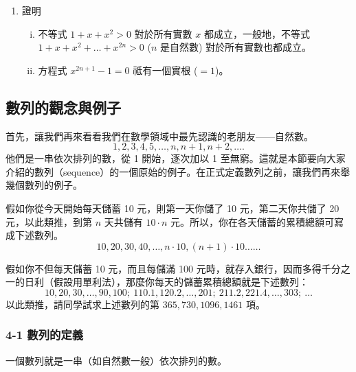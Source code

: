 \begin{enumerate}
    \item 證明
    \begin{enumerate}[(i)]
        \item 不等式 $1+x+x^2>0$ 對於所有實數 $x$ 都成立，一般地，不等式 $1+x+x^2+\dots+x^{2n}>0$ ($n$ 是自然數) 對於所有實數也都成立。
        \item 方程式 $x^{2n+1}-1=0$ 祗有一個實根 ($=1$)。
    \end{enumerate}
\end{enumerate}

\subsection{數列的觀念與例子}\label{sec:b2_2-4}

首先，讓我們再來看看我們在數學領域中最先認識的老朋友——自然數。
\[
1, 2, 3, 4, 5, \dots, n, n+1, n+2, \dots.
\]
他們是一串依次排列的數，從 1 開始，逐次加以 1 至無窮。這就是本節要向大家介紹的數列（sequence）的一個原始的例子。在正式定義數列之前，讓我們再來舉幾個數列的例子。

\begin{example}\label{ex:b2_2-4-1}
假如你從今天開始每天儲蓄 10 元，則第一天你儲了 10 元，第二天你共儲了 20 元，以此類推，到第 $n$ 天共儲有 $10\cdot n$ 元。所以，你在各天儲蓄的累積總額可寫成下述數列。
\[
10, 20, 30, 40, \dots, n\cdot 10, (n+1)\cdot 10 \dots\dots
\]
\end{example}

\begin{example}\label{ex:b2_2-4-2}
假如你不但每天儲蓄 10 元，而且每儲滿 100 元時，就存入銀行，因而多得千分之一的日利（假設用單利法），那麼你每天的儲蓄累積總額就是下述數列：
\[
10, 20, 30, \dots, 90, 100;\ 110.1, 120.2, \dots, 201;\ 211.2, 221.4, \dots, 303;\ \dots
\]
以此類推，請同學試求上述數列的第 $365, 730, 1096, 1461$ 項。
\end{example}

\subsubsection*{4-1 數列的定義}

一個數列就是一串（如自然數一般）依次排列的數。

